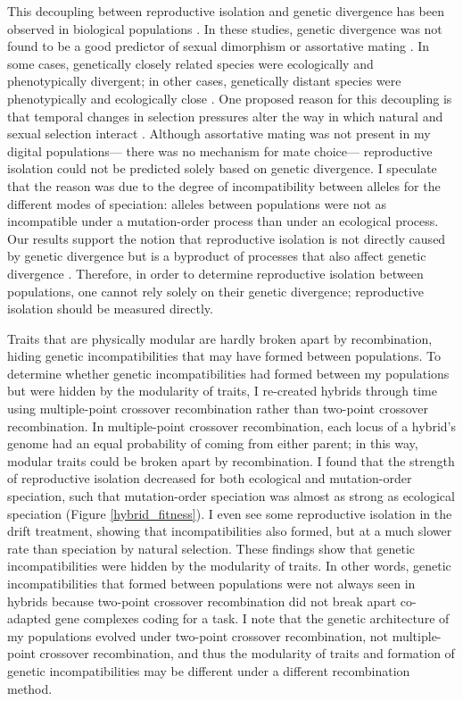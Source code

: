 \begin{doublespace}
This decoupling between reproductive isolation and genetic divergence
has been observed in biological populations \citep{ste09,mac12}.
%
In these studies, genetic divergence was not found to be a good predictor
of sexual dimorphism or assortative mating \citep{ste09,mac12}.
%
In some cases, genetically closely related species
were ecologically and phenotypically divergent;
in other cases, genetically distant species
were phenotypically and ecologically close \citep{ste09}.
%
One proposed reason for this decoupling
is that temporal changes in selection pressures
alter the way in which natural and sexual selection interact \citep{mac12}.
%
Although assortative mating was not present in my digital populations---%
there was no mechanism for mate choice---%
reproductive isolation could not be predicted
solely based on genetic divergence.
%
I speculate that the reason was due to the degree of incompatibility
between alleles for the different modes of speciation:
alleles between populations were not as incompatible
under a mutation-order process than under an ecological process.
%
Our results support the notion that reproductive isolation
is not directly caused by genetic divergence but is a byproduct
of processes that also affect genetic divergence \citep{per11}.
%
Therefore, in order to determine reproductive isolation between populations,
one cannot rely solely on their genetic divergence;
reproductive isolation should be measured directly.



Traits that are physically modular
are hardly broken apart by recombination,
hiding genetic incompatibilities
that may have formed between populations.
%
To determine whether genetic incompatibilities
had formed between my populations
but were hidden by the modularity of traits,
I re-created hybrids through time using multiple-point crossover recombination
rather than two-point crossover recombination.
%
In multiple-point crossover recombination,
each locus of a hybrid's genome had an equal probability
of coming from either parent;
in this way, modular traits could be broken apart by recombination.
%
I found that the strength of reproductive isolation
decreased for both ecological and mutation-order speciation,
such that mutation-order speciation
was almost as strong as ecological speciation (Figure \ref{hybrid_fitness}).
%
I even see some reproductive isolation in the drift treatment,
showing that incompatibilities also formed,
but at a much slower rate than speciation by natural selection.
%
These findings show that genetic incompatibilities
were hidden by the modularity of traits.
%
In other words, genetic incompatibilities that formed between populations
were not always seen in hybrids because two-point crossover recombination
did not break apart co-adapted gene complexes coding for a task.
%
I note that the genetic architecture of my populations
evolved under two-point crossover recombination,
not multiple-point crossover recombination,
and thus the modularity of traits
and formation of genetic incompatibilities
may be different under a different recombination method.




\end{doublespace}
